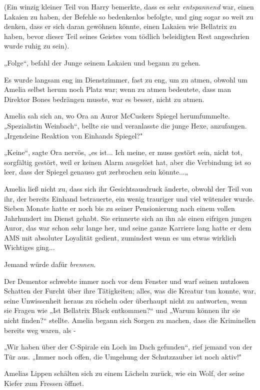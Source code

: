 {(Ein winzig kleiner Teil von Harry bemerkte, dass es sehr \emph{entspannend} war, einen Lakaien zu haben, der Befehle so bedenkenlos befolgte, und ging sogar so weit zu denken, dass er sich daran gewöhnen könnte, einen Lakaien wie Bellatrix zu haben, bevor dieser Teil seines Geistes vom tödlich beleidigten Rest angeschrien wurde ruhig zu sein).

„Folge“, befahl der Junge seinem Lakaien und begann zu gehen.

Es wurde langsam eng im Dienstzimmer, fast zu eng, um zu atmen, obwohl um Amelia selbst herum noch Platz war; wenn zu atmen bedeutete, dass man Direktor Bones bedrängen musste, war es besser, nicht zu atmen.

Amelia sah sich an, wo Ora an Auror McCuskers Spiegel herumfummelte. „Spezialistin Weinbach“, bellte sie und veranlasste die junge Hexe, anzufangen. „Irgendeine Reaktion von Einhands Spiegel?"

„Keine“, sagte Ora nervös, „es ist... Ich meine, er muss gestört sein, nicht tot, sorgfältig gestört, weil er keinen Alarm ausgelöst hat, aber die Verbindung ist so leer, dass der Spiegel genauso gut zerbrochen sein könnte...„

Amelia ließ nicht zu, dass sich ihr Gesichtsausdruck änderte, obwohl der Teil von ihr, der bereits Einhand betrauerte, ein wenig trauriger und viel wütender wurde. Sieben Monate hatte er noch bis zu seiner Pensionierung nach einem vollen Jahrhundert im Dienst gehabt. Sie erinnerte sich an ihn als einen eifrigen jungen Auror, das war schon sehr lange her, und seine ganze Karriere lang hatte er dem AMS mit absoluter Loyalität gedient, zumindest wenn es um etwas wirklich Wichtiges ging...

Jemand würde dafür \emph{brennen}.

Der Dementor schwebte immer noch vor dem Fenster und warf seinen nutzlosen Schatten der Furcht über ihre Tätigkeiten; alles, was die Kreatur tun konnte, war, seine Unwissenheit heraus zu röcheln oder überhaupt nicht zu antworten, wenn sie Fragen wie „Ist Bellatrix Black entkommen?“ und „Warum können ihr sie nicht finden?“ stellte. Amelia begann sich Sorgen zu machen, dass die Kriminellen bereits weg waren, als -

„Wir haben über der C-Spirale ein Loch im Dach gefunden“, rief jemand von der Tür aus. „Immer noch offen, die Umgehung der Schutzzauber ist noch aktiv!"

Amelias Lippen schälten sich zu einem Lächeln zurück, wie ein Wolf, der seine Kiefer zum Fressen öffnet.

}
